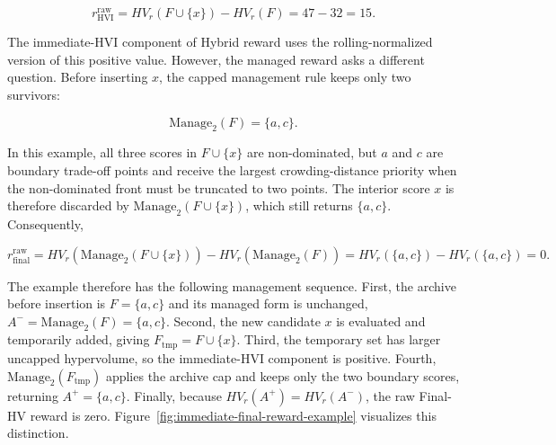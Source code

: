 \begin{equation}
  r_{\mathrm{HVI}}^{\mathrm{raw}}
  =
  HV_r(F\cup\{x\})-HV_r(F)
  =
  47-32
  =
  15.
\end{equation}

The immediate-HVI component of Hybrid reward uses the rolling-normalized version of this positive value. However, the managed reward asks a different question. Before inserting $x$, the capped management rule keeps only two survivors:

\begin{equation}
  \mathrm{Manage}_2(F)=\{a,c\}.
\end{equation}

In this example, all three scores in $F\cup\{x\}$ are non-dominated, but $a$ and $c$ are boundary trade-off points and receive the largest crowding-distance priority when the non-dominated front must be truncated to two points. The interior score $x$ is therefore discarded by $\mathrm{Manage}_2(F\cup\{x\})$, which still returns $\{a,c\}$. Consequently,

\begin{equation}
  r_{\mathrm{final}}^{\mathrm{raw}}
  =
  HV_r(\mathrm{Manage}_2(F\cup\{x\}))
  -
  HV_r(\mathrm{Manage}_2(F))
  =
  HV_r(\{a,c\})-HV_r(\{a,c\})
  =
  0.
\end{equation}

The example therefore has the following management sequence. First, the archive before insertion is $F=\{a,c\}$ and its managed form is unchanged, $A^-=\mathrm{Manage}_2(F)=\{a,c\}$. Second, the new candidate $x$ is evaluated and temporarily added, giving $F_{\mathrm{tmp}}=F\cup\{x\}$. Third, the temporary set has larger uncapped hypervolume, so the immediate-HVI component is positive. Fourth, $\mathrm{Manage}_2(F_{\mathrm{tmp}})$ applies the archive cap and keeps only the two boundary scores, returning $A^+=\{a,c\}$. Finally, because $HV_r(A^+)=HV_r(A^-)$, the raw Final-HV reward is zero. Figure~\ref{fig:immediate-final-reward-example} visualizes this distinction.

